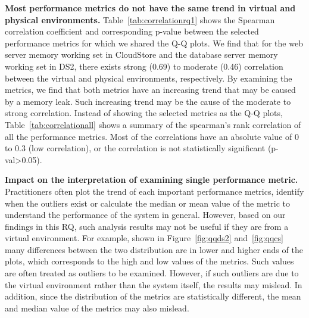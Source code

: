 \documentclass[smallextended]{svjour3}       %
\begin{document}
\textbf{Most performance metrics do not have the same trend in virtual and physical environments.} Table~\ref{tab:correlationrq1} shows the Spearman correlation coefficient and corresponding p-value between the selected performance metrics for which we shared the Q-Q plots. We find that for the web server memory working set in CloudStore and the database server memory working set in DS2, there exists strong (0.69) to moderate (0.46) correlation between the virtual and physical environments, respectively. By examining the metrics, we find that both metrics have an increasing trend that may be caused by a memory leak. Such increasing trend may be the cause of the moderate to strong correlation. Instead of showing the selected metrics as the Q-Q plots, Table~\ref{tab:correlationall} shows a summary of the spearman's rank correlation of all the performance metrics. Most of the correlations have an absolute value of 0 to 0.3 (low correlation), or the correlation is not statistically significant (p-val\textgreater0.05).

\textbf{Impact on the interpretation of examining single performance metric.} Practitioners often plot the trend of each important performance metrics, identify when the outliers exist or calculate the median or mean value of the metric to understand the performance of the system in general. However, based on our findings in this RQ, such analysis results may not be useful if they are from a virtual environment. For example, shown in Figure~\ref{fig:qqds2} and~\ref{fig:qqcs} many differences between the two distribution are in lower and higher ends of the plots, which corresponds to the high and low values of the metrics. Such values are often treated as outliers to be examined. However, if such outliers are due to the virtual environment rather than the system itself, the results may mislead. In addition, since the distribution of the metrics are statistically different, the mean and median value of the metrics may also mislead. 

\noindent{}
\end{document}
